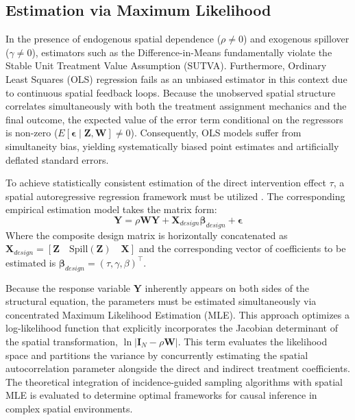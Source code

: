 \documentclass[11pt]{article}
\begin{document}
\subsection{Estimation via Maximum Likelihood}

In the presence of endogenous spatial dependence ($\rho \neq 0$) and exogenous spillover ($\gamma \neq 0$), estimators such as the Difference-in-Means fundamentally violate the Stable Unit Treatment Value Assumption (SUTVA). Furthermore, Ordinary Least Squares (OLS) regression fails as an unbiased estimator in this context due to continuous spatial feedback loops. Because the unobserved spatial structure correlates simultaneously with both the treatment assignment mechanics and the final outcome, the expected value of the error term conditional on the regressors is non-zero ($E[\bm{\epsilon} \mid \bm{Z}, \bm{W}] \neq 0$). Consequently, OLS models suffer from simultaneity bias, yielding systematically biased point estimates and artificially deflated standard errors.

To achieve statistically consistent estimation of the direct intervention effect $\tau$, a spatial autoregressive regression framework must be utilized \cite{bivand_comparing_2015}. The corresponding empirical estimation model takes the matrix form:
\begin{equation}
    \bm{Y} = \rho \bm{W} \bm{Y} + \bm{X}_{design}\bm{\beta}_{design} + \bm{\epsilon}
\end{equation}
Where the composite design matrix is horizontally concatenated as $\bm{X}_{design} = [\bm{Z} \quad \text{Spill}(\bm{Z}) \quad \bm{X}]$ and the corresponding vector of coefficients to be estimated is $\bm{\beta}_{design} = (\tau, \gamma, \beta)^\top$. 

Because the response variable $\bm{Y}$ inherently appears on both sides of the structural equation, the parameters must be estimated simultaneously via concentrated Maximum Likelihood Estimation (MLE). This approach optimizes a log-likelihood function that explicitly incorporates the Jacobian determinant of the spatial transformation, $\ln|\bm{I}_N - \rho \bm{W}|$. This term evaluates the likelihood space and partitions the variance by concurrently estimating the spatial autocorrelation parameter alongside the direct and indirect treatment coefficients. The theoretical integration of incidence-guided sampling algorithms with spatial MLE is evaluated to determine optimal frameworks for causal inference in complex spatial environments.



\end{document}
